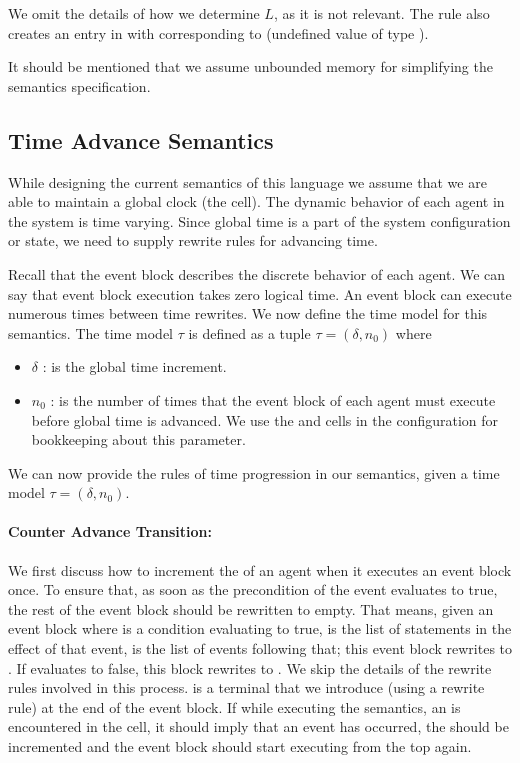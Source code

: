 We omit the details of how we determine $L$, as it is not relevant. The rule also creates an entry in  with  corresponding to  (undefined value of type ).  

It should be mentioned that we assume unbounded memory for simplifying the semantics specification.  

\subsection[h]{Time Advance Semantics}
\label{sect:exec}


While designing the current semantics of this language we assume that we are able to maintain a global clock (the  cell). The dynamic behavior of each agent in the system is time varying. Since global time is a part of the system configuration or state, we need to supply rewrite rules for advancing time.

 Recall that the event block describes the discrete behavior of each agent. We can say that event block execution takes zero logical time. An event block can execute numerous times between time rewrites. We now define the time model for this semantics. The time model $\tau$ is defined as a tuple $\tau = (\delta, n_0)$ where 
 \begin{itemize}
 \item $\delta$ : is the global time increment. 
 \item $n_0$ : is the number of times that the event block of each agent must execute before global time is advanced. We use the  and  cells in the configuration for bookkeeping about this parameter. 
 \end{itemize}
We can now provide the rules of time progression in our semantics, given a time model $\tau = (\delta,n_0)$. 

\paragraph{Counter Advance Transition:}
We first discuss how to increment the  of an agent when it executes an event block once. To ensure that, as soon as the precondition of the event evaluates to true, the rest of the event block should be rewritten to empty. That means, given an event block  where  is a condition evaluating to true,  is the list of statements in the effect of that event,  is the list of events following that; this event block rewrites to . If  evaluates to false, this block rewrites to . We skip the details of the rewrite rules involved in this process. 
 is a terminal that we introduce (using a rewrite rule) at the end of the event block. If while executing the semantics, an  is encountered in the  cell, it should imply that an event has occurred, the  should be incremented and  the event block should start executing from the top again.
 
